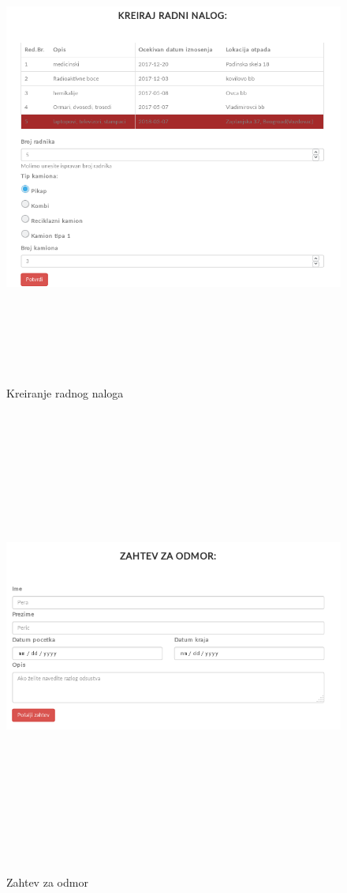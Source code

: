 \documentclass[10 pt]{article}
\begin{document}
	
		\begin{figure}[H]
			\centering
			\includegraphics[width=15cm,height=15cm,keepaspectratio]{GUI/formularRadniNalog.png}\\
			\caption{Kreiranje radnog naloga}
			\label{fig:radniNalog}
		\end{figure}
		
		
		\begin{figure}[H]
			\centering
			\includegraphics[width=15cm,height=15cm,keepaspectratio]{GUI/formularZahtevZaOdmor.png}\\
			\caption{Zahtev za odmor}
			\label{fig:Odmor}
		\end{figure}
	
	
	
\end{document}
